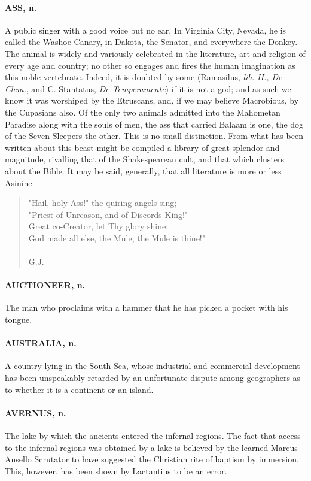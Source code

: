 \documentclass[11pt]{article}
\begin{document}
\paragraph{ASS, n.}  A public singer with a good voice but no ear.  In Virginia
City, Nevada, he is called the Washoe Canary, in Dakota, the Senator,
and everywhere the Donkey.  The animal is widely and variously
celebrated in the literature, art and religion of every age and
country; no other so engages and fires the human imagination as this
noble vertebrate.  Indeed, it is doubted by some (Ramasilus, {\em lib.
II., De Clem.}, and C. Stantatus, {\em De Temperamente}) if it is not a
god; and as such we know it was worshiped by the Etruscans, and, if we
may believe Macrobious, by the Cupasians also.  Of the only two
animals admitted into the Mahometan Paradise along with the souls of
men, the ass that carried Balaam is one, the dog of the Seven Sleepers
the other.  This is no small distinction.  From what has been written
about this beast might be compiled a library of great splendor and
magnitude, rivalling that of the Shakespearean cult, and that which
clusters about the Bible.  It may be said, generally, that all
literature is more or less Asinine.

\begin{quote}   "Hail, holy Ass!" the quiring angels sing; \\
  "Priest of Unreason, and of Discords King!" \\
  Great co-Creator, let Thy glory shine: \\
  God made all else, the Mule, the Mule is thine!" \\
 \\
G.J. \end{quote}


\paragraph{AUCTIONEER, n.}  The man who proclaims with a hammer that he has picked
a pocket with his tongue.

\paragraph{AUSTRALIA, n.}  A country lying in the South Sea, whose industrial and
commercial development has been unspeakably retarded by an unfortunate
dispute among geographers as to whether it is a continent or an
island.

\paragraph{AVERNUS, n.}  The lake by which the ancients entered the infernal
regions.  The fact that access to the infernal regions was obtained by
a lake is believed by the learned Marcus Ansello Scrutator to have
suggested the Christian rite of baptism by immersion.  This, however,
has been shown by Lactantius to be an error.
\end{document}
